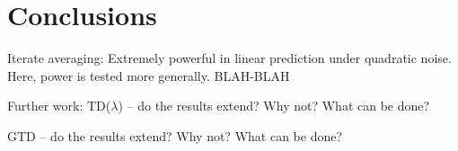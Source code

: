 \section{Conclusions}
\label{sec:conc}
Iterate averaging: Extremely powerful in linear prediction under quadratic noise.
Here, power is tested more generally.
BLAH-BLAH

Further work:
TD($\lambda$) -- do the results extend? Why not? What can be done?

GTD -- do the results extend? Why not? What can be done?
